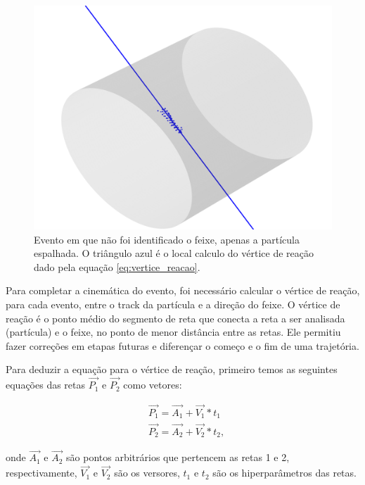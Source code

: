 \documentclass[a4paper,12pt,oneside]{book}
\begin{document}
\begin{figure}[H]
    \centering
    \includegraphics[scale = 0.65]{figs/Figure_12.png}
    \caption{Evento em que não foi identificado o feixe, apenas a partícula espalhada. O triângulo azul é o local calculo do vértice de reação dado pela equação \ref{eq:vertice_reacao}.}
    \label{fig:exemplo_sem_feixe}
\end{figure}

\par Para completar a cinemática do evento, foi necessário calcular o vértice de reação, para cada evento, entre o track da partícula e a direção do feixe. O vértice de reação é o ponto médio do segmento de reta que conecta a reta a ser analisada (partícula) e o feixe, no ponto de menor distância entre as retas. Ele permitiu fazer correções em etapas futuras e diferençar o começo e o fim de uma trajetória.

\par Para deduzir a equação para o vértice de reação, primeiro temos as seguintes equações das retas $\vec{P_1}$ e $\vec{P_2}$ como vetores:

\begin{equation}
\begin{split}
        &\vec{P_1} = \vec{A_1} + \vec{V_1} * t_1 \\
        &\vec{P_2} = \vec{A_2} + \vec{V_2} * t_2,
\end{split}
\end{equation}

onde $\vec{A_1}$ e $\vec{A_2}$ são pontos arbitrários que pertencem as retas 1 e 2, respectivamente, $\vec{V_1}$ e $\vec{V_2}$ são os versores, $t_1$ e  $t_2$ são os hiperparâmetros das retas.
\end{document}
